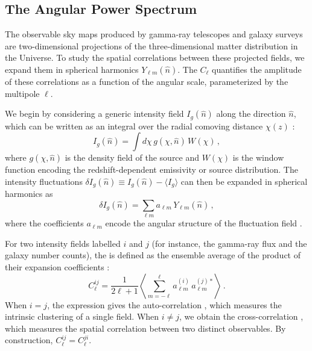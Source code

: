 \subsection{The Angular Power Spectrum}
\label{sec:angular_power_spectrum}

The observable sky maps produced by gamma-ray telescopes and galaxy surveys are two-dimensional projections of the three-dimensional matter distribution in the Universe.
To study the spatial correlations between these projected fields, we expand them in spherical harmonics $Y_{\ell m}(\hat{n})$.
The \APS $C_\ell$ quantifies the amplitude of these correlations as a function of the angular scale, parameterized by the multipole $\ell$.

We begin by considering a generic intensity field $I_g(\hat{n})$ along the direction $\hat{n}$, which can be written as an integral over the radial comoving distance $\chi(z)$ \cite{Fornengo:2013rga,Camera:2012cj}:
\begin{equation}
	I_g(\hat{n}) = \int d\chi\, g(\chi, \hat{n})\, W(\chi)\,,
	\label{eq:intensity_field}
\end{equation}
where $g(\chi, \hat{n})$ is the density field of the source and $W(\chi)$ is the window function encoding the redshift-dependent emissivity or source distribution.
The intensity fluctuations $\delta I_g(\hat{n}) \equiv I_g(\hat{n}) - \langle I_g \rangle$ can then be expanded in spherical harmonics as
\begin{equation}
	\delta I_g(\hat{n}) = \sum_{\ell m} a_{\ell m}\, Y_{\ell m}(\hat{n})\,,
	\label{eq:spherical_harmonic_expansion}
\end{equation}
where the coefficients $a_{\ell m}$ encode the angular structure of the fluctuation field \cite{Fornengo:2013rga}.

For two intensity fields labelled $i$ and $j$ (for instance, the gamma-ray flux and the galaxy number counts), the \APS is defined as the ensemble average of the product of their expansion coefficients \cite{Fornengo:2013rga,Camera:2012cj}:
\begin{equation}
	C_\ell^{ij} = \frac{1}{2\ell+1} \left\langle \sum_{m=-\ell}^{\ell} a_{\ell m}^{(i)}\, a_{\ell m}^{(j)*} \right\rangle\,.
	\label{eq:aps_definition}
\end{equation}
When $i = j$, the expression gives the auto-correlation \APS, which measures the intrinsic clustering of a single field.
When $i \neq j$, we obtain the cross-correlation \APS, which measures the spatial correlation between two distinct observables.
By construction, $C_\ell^{ij} = C_\ell^{ji}$.

